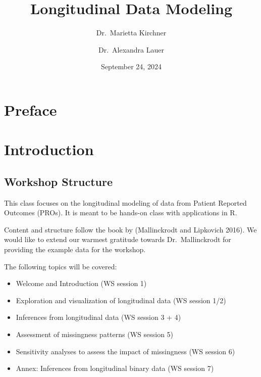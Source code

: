 \documentclass[
  letterpaper,
  DIV=11,
  numbers=noendperiod]{scrreprt}
\title{Longitudinal Data Modeling}
\author{Dr.~Marietta Kirchner \and Dr.~Alexandra Lauer}
\date{September 24, 2024}
\renewcommand*\contentsname{Table of contents}
\newcommand\contentsname{Table of contents}
\begin{document}
\maketitle
\ifdefined\Shaded\renewenvironment{Shaded}{\begin{tcolorbox}[boxrule=0pt, breakable, borderline west={3pt}{0pt}{shadecolor}, enhanced, interior hidden, frame hidden, sharp corners]}{\end{tcolorbox}}\fi

\renewcommand*\contentsname{Table of contents}
{
\hypersetup{linkcolor=}
\setcounter{tocdepth}{2}
\tableofcontents
}

\hypertarget{preface}{%
\chapter*{Preface}\label{preface}}



\hypertarget{introduction}{%
\chapter{Introduction}\label{introduction}}

\hypertarget{workshop-structure}{%
\section{Workshop Structure}\label{workshop-structure}}

This class focuses on the longitudinal modeling of data from Patient
Reported Outcomes (PROs). It is meant to be hands-on class with
applications in R.

Content and structure follow the book by (Mallinckrodt and Lipkovich
2016). We would like to extend our warmest gratitude towards
Dr.~Mallinckrodt for providing the example data for the workshop.

The following topics will be covered:

\begin{itemize}
\item
  Welcome and Introduction (WS session 1)
\item
  Exploration and visualization of longitudinal data (WS session 1/2)
\item
  Inferences from longitudinal data (WS session 3 + 4)
\item
  Assessment of missingness patterns (WS session 5)
\item
  Sensitivity analyses to assess the impact of missingness (WS session
  6)
\item
  Annex: Inferences from longitudinal binary data (WS session 7)
\end{itemize}
\end{document}
